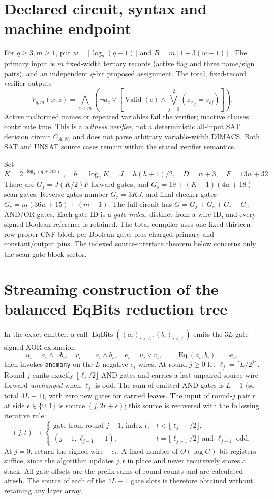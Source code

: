 \documentclass[11pt]{article}
\begin{document}
\section{Declared circuit, syntax and machine endpoint}
For $q\ge3,m\ge1$, put $w=\lceil\log_2(q+1)\rceil$ and $B=m[1+3(w+1)]$. The primary input is $m$ fixed-width ternary records (active flag and three name/sign pairs), and an independent $q$-bit proposed assignment. The total, fixed-record verifier outputs
\[
 V_{q,m}(x,z)=\bigwedge_{c<m}\left(\neg a_c\vee\left[\operatorname{Valid}(c)\wedge\bigvee_{j=0}^2(z_{v_{cj}}=s_{cj})\right]\right).
\]
Active malformed names or repeated variables fail the verifier; inactive clauses contribute true. This is a \emph{witness verifier}, not a deterministic all-input SAT decision circuit $C_{A,N}$, and does not parse arbitrary variable-width DIMACS. Both SAT and UNSAT source cases remain within the stated verifier semantics.

Set
\[
 K=2^{\lceil\log_2(q+3m)\rceil},\quad h=\log_2K,\quad J=h(h+1)/2,\quad D=w+3,\quad F=13w+32.
\]
There are $G_f=J(K/2)F$ forward gates, and $G_s=19+(K-1)(4w+18)$ scan gates. Reverse gates number $G_r=3KJ$, and final checker gates $G_c=m(36w+15)+(m-1)$. The full circuit has $G=G_f+G_s+G_r+G_c$ AND/OR gates. Each gate ID is a \emph{gate index}, distinct from a wire ID, and every signed Boolean reference is retained. The total compiler uses one fixed thirteen-row proper-CNF block per Boolean gate, plus charged primary and constant/output pins. The indexed source-interface theorem below concerns only the scan gate-block sector.

\section{Streaming construction of the balanced EqBits reduction tree}
In the exact emitter, a call $\operatorname{EqBits}((a_i)_{i<L},(b_i)_{i<L})$ emits the $3L$-gate signed XOR expansion
\[
 u_i=a_i\wedge\neg b_i,\quad v_i=\neg a_i\wedge b_i,\quad e_i=u_i\vee v_i,
 \qquad \operatorname{Eq}(a_i,b_i)=\neg e_i,
\]
then invokes \texttt{andmany} on the $L$ negative $e_i$ wires. At round $j\ge0$ let $\ell_j=\lceil L/2^j\rceil$. Round $j$ emits exactly $\lfloor\ell_j/2\rfloor$ AND gates and carries a last unpaired source wire forward \emph{unchanged} when $\ell_j$ is odd. The sum of emitted AND gates is $L-1$ (so total $4L-1$), with zero new gates for carried leaves. The input of round-$j$ pair $r$ at side $\epsilon\in\{0,1\}$ is source $(j,2r+\epsilon)$; this source is recovered with the following iterative rule:
\[
 (j,t)\longrightarrow\begin{cases}
 \text{gate from round $j-1$, index $t$},&t<\lfloor\ell_{j-1}/2\rfloor,\\
 (j-1,\ell_{j-1}-1),&t=\lfloor\ell_{j-1}/2\rfloor\text{ and }\ell_{j-1}\text{ odd}.
 \end{cases}
\]
At $j=0$, return the signed wire $-e_t$. A fixed number of $O(\log G)$-bit registers suffice, since the algorithm updates $j,t$ in place and never recursively stores a stack. All gate offsets are the prefix sums of round counts and are calculated afresh. The source of each of the $4L-1$ gate slots is therefore obtained without retaining any layer array.
\end{document}
